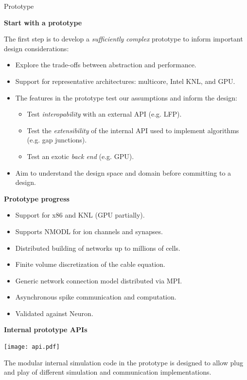 \documentclass[a0paper,portrait]{baposter}
\newcommand{\centerheader}[1]{\begin{center}\bfseries\Large{#1}\end{center} \vspace{-6pt}}
\newcommand{\newemph}[1]{{\color{blue!40!black}\em #1}}
\begin{document}
\begin{poster}
\begin{posterbox}[name=nestmc,column=0,below=who,span=2]{Prototype}
    \begin{minipage}[t]{0.42\textwidth}
        \centerheader{Start with a prototype}
         The first step is to develop a \newemph{sufficiently complex} prototype to inform important design considerations:
        \begin{itemize}
            \item Explore the trade-offs between abstraction and performance.
            \item Support for representative architectures:
                  multicore, Intel KNL, and GPU.
            \item The features in the prototype test our assumptions and inform the design:
            \begin{itemize}
                \item Test \newemph{interopability} with an external API (e.g. LFP).
                \item Test the \newemph{extensibility} of the internal API used to implement algorithms (e.g. gap junctions).
                \item Test an exotic \newemph{back end} (e.g. GPU).
            \end{itemize}
            \item Aim to understand the design space and domain before committing to a design.
        \end{itemize}
   \end{minipage}
\hfill
    \begin{minipage}[t]{0.55\textwidth}
        \centerheader{Prototype progress}
            \vspace{-4pt} %
        \begin{itemize}
            \item Support for x86 and KNL (GPU partially).
            \item Supports NMODL for ion channels and synapses.
            \item Distributed building of networks up to millions of cells.
            \item Finite volume discretization of the cable equation.
            \item Generic network connection model distributed via MPI.
            \item Asynchronous spike communication and computation.
            \item Validated against Neuron.
        \end{itemize}
            \vspace{-8pt} %
        \centerheader{Internal prototype APIs}
        \texttt{[image: api.pdf]}
            \vspace{-25pt}
        \begin{center}\scriptsize{The modular internal simulation code in the prototype is designed to allow plug and play of different simulation and communication implementations.}\end{center}
   \end{minipage}


\end{posterbox}
\end{poster}
\end{document}
